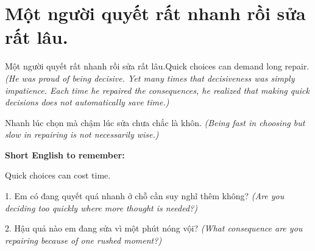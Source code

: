 \section{Một người quyết rất nhanh rồi sửa rất lâu.}
\begin{truyen}{Một người quyết rất nhanh rồi sửa rất lâu.}{Quick choices can demand long repair.}
\textit{(He was proud of being decisive. Yet many times that decisiveness was simply impatience. Each time he repaired the consequences, he realized that making quick decisions does not automatically save time.)}
\end{truyen}
\begin{baihoc}
Nhanh lúc chọn mà chậm lúc sửa chưa chắc là khôn.
\textit{(Being fast in choosing but slow in repairing is not necessarily wise.)}
\end{baihoc}
\begin{ghinhoanh}
\textbf{Short English to remember:}

Quick choices can cost time.
\end{ghinhoanh}
\begin{tuhocnhanh}
1. Em có đang quyết quá nhanh ở chỗ cần suy nghĩ thêm không? \textit{(Are you deciding too quickly where more thought is needed?)}

2. Hậu quả nào em đang sửa vì một phút nóng vội? \textit{(What consequence are you repairing because of one rushed moment?)}
\end{tuhocnhanh}
\ngancach


